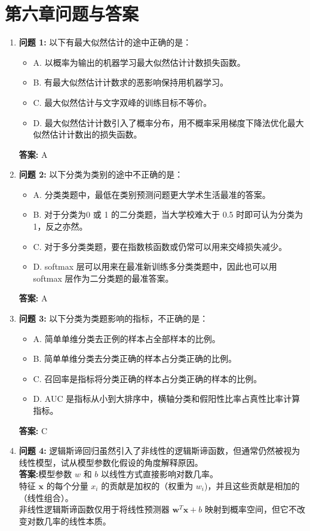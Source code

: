 \documentclass[a4paper,12pt]{book}
\begin{document}
\section*{第六章问题与答案}

\begin{enumerate}

\item \textbf{问题 1:} 以下有最大似然估计的途中正确的是：
\begin{itemize}
\item A. 以概率为输出的机器学习最大似然估计计数损失函数。
\item B. 有最大似然估计计数求的恶影响保持用机器学习。
\item C. 最大似然估计与文字双峰的训练目标不等价。
\item D. 最大似然估计计数引入了概率分布，用不概率采用梯度下降法优化最大似然估计计数出的损失函数。
\end{itemize}
\textbf{答案:} A

\item \textbf{问题 2:} 以下分类为类别的途中不正确的是：
\begin{itemize}
\item A. 分类类题中，最低在类别预测问题更大学术生活最准的答案。
\item B. 对于分类为0 或 1 的二分类题，当大学校难大于 0.5 时即可认为分类为 1，反之亦然。
\item C. 对于多分类类题，要在指数核函数或仍常可以用来交峰损失减少。
\item D. softmax 层可以用来在最准新训练多分类类题中，因此也可以用 softmax 层作为二分类题的最准答案。
\end{itemize}
\textbf{答案:} A

\item \textbf{问题 3:} 以下分类为类题影响的指标，不正确的是：
\begin{itemize}
\item A. 简单单维分类去正例的样本占全部样本的比例。
\item B. 简单单维分类去分类正确的样本占分类正确的比例。
\item C. 召回率是指标将分类正确的样本占分类正确的样本的比例。
\item D. AUC 是指标从小到大排序中，横轴分类和假阳性比率占真性比率计算指标。
\end{itemize}
\textbf{答案:} C

\item \textbf{问题 4:} 逻辑斯谛回归虽然引入了非线性的逻辑斯谛函数，但通常仍然被视为线性模型，试从模型参数化假设的角度解释原因。\\
\textbf{答案:}模型参数 \( w \) 和 \( b \) 以线性方式直接影响对数几率。\\
特征 \( \mathbf{x} \) 的每个分量 \( x_i \) 的贡献是加权的（权重为 \( w_i \))，并且这些贡献是相加的（线性组合）。\\
非线性逻辑斯谛函数仅用于将线性预测器 \( \mathbf{w}^T \mathbf{x} + b \) 映射到概率空间，但它不改变对数几率的线性本质。


\end{enumerate}
\end{document}
